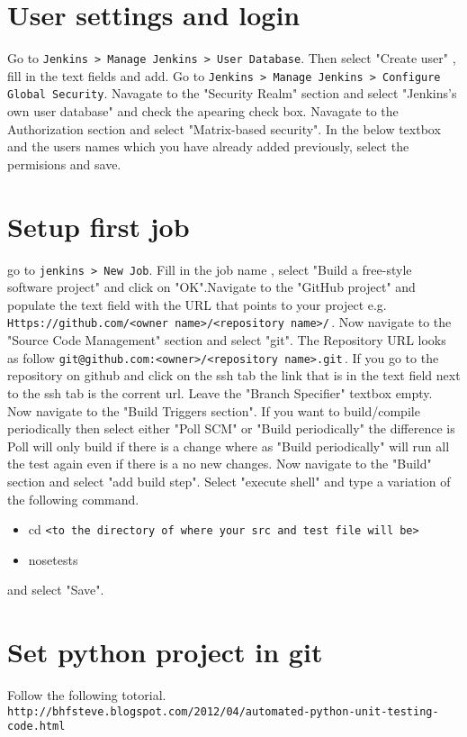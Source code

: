 \documentclass[a4paper]{article}
\begin{document}
\section{User settings and login}
Go to \verb#Jenkins > Manage Jenkins > User Database#.
Then select "Create user" , fill in the text fields and add. 
Go to \verb#Jenkins > Manage Jenkins > Configure Global Security#.
Navagate to the "Security Realm" section and select "Jenkins's own user database" and check the apearing check box. Navagate to the Authorization section and select "Matrix-based security". In the below textbox and the users names which you have already added previously, select the permisions and save.
\section{Setup first job}
go to \verb#jenkins > New Job#.
Fill in the job name , select "Build a free-style software project" and
click on "OK".Navigate to the "GitHub project" and populate the text field with the URL that points to
your project e.g. \verb#Https://github.com/<owner name>/<repository name>/#\,.
Now navigate to the "Source Code Management" section and select "git". The Repository URL looks as follow \verb#git@github.com:<owner>/<repository name>.git#\,.
If you go to the repository on github and click on the ssh tab the link that is in the text field next to the ssh tab is the corrent url. Leave the "Branch Specifier" textbox empty.
Now navigate to the "Build Triggers section".
If you want to build/compile periodically then select either "Poll SCM" or "Build periodically" the difference is Poll will only build if there is a change where as "Build periodically" will run all the test again even if there is a no new changes.
Now navigate to the "Build" section and select "add build step". Select "execute shell" and type a variation of the following command.
\begin{itemize}
\item cd \verb#<to the directory of where your src and test file will be>#
\item nosetests   
\end{itemize}
and select "Save".
\section{Set python project in git}
Follow the following totorial. 
\verb#http://bhfsteve.blogspot.com/2012/04/automated-python-unit-testing-code.html#
\end{document}
